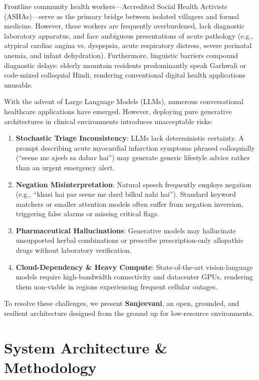 \documentclass[conference]{IEEEtran}
\begin{document}
Frontline community health workers---Accredited Social Health Activists (ASHAs)---serve as the primary bridge between isolated villagers and formal medicine. However, these workers are frequently overburdened, lack diagnostic laboratory apparatus, and face ambiguous presentations of acute pathology (e.g., atypical cardiac angina vs. dyspepsia, acute respiratory distress, severe perinatal anemia, and infant dehydration). Furthermore, linguistic barriers compound diagnostic delays: elderly mountain residents predominantly speak Garhwali or code-mixed colloquial Hindi, rendering conventional digital health applications unusable.

With the advent of Large Language Models (LLMs), numerous conversational healthcare applications have emerged. However, deploying pure generative architectures in clinical environments introduces unacceptable risks:
\begin{enumerate}
    \item \textbf{Stochastic Triage Inconsistency}: LLMs lack deterministic certainty. A prompt describing acute myocardial infarction symptoms phrased colloquially (``seene me ajeeb sa dabav hai'') may generate generic lifestyle advice rather than an urgent emergency alert.
    \item \textbf{Negation Misinterpretation}: Natural speech frequently employs negation (e.g., ``khasi hai par seene me dard bilkul nahi hai''). Standard keyword matchers or smaller attention models often suffer from negation inversion, triggering false alarms or missing critical flags.
    \item \textbf{Pharmaceutical Hallucinations}: Generative models may hallucinate unsupported herbal combinations or prescribe prescription-only allopathic drugs without laboratory verification.
    \item \textbf{Cloud-Dependency \& Heavy Compute}: State-of-the-art vision-language models require high-bandwidth connectivity and datacenter GPUs, rendering them non-viable in regions experiencing frequent cellular outages.
\end{enumerate}

To resolve these challenges, we present \textbf{Sanjeevani}, an open, grounded, and resilient architecture designed from the ground up for low-resource environments.

\section{System Architecture \& Methodology}
\end{document}
